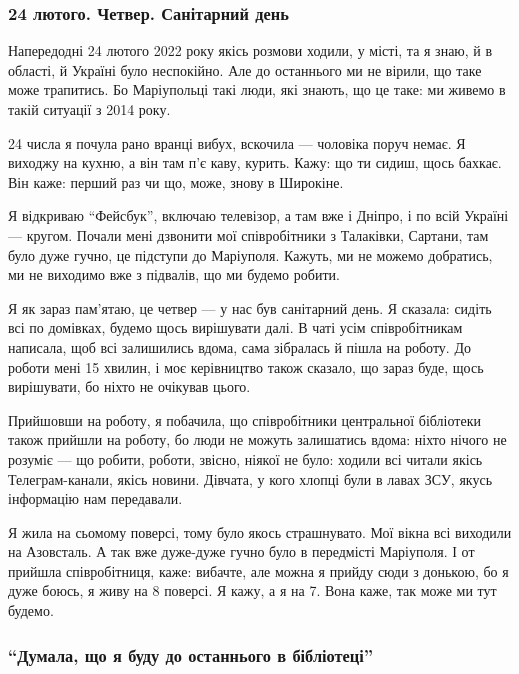 \subsubsection{24 лютого. Четвер. Санітарний день}

Напередодні 24 лютого 2022 року якісь розмови ходили, у місті, та я знаю, й в
області, й Україні було неспокійно. Але до останнього ми не вірили, що таке
може трапитись. Бо Маріупольці такі люди, які знають, що це таке: ми живемо в
такій ситуації з 2014 року.

24 числа я почула рано вранці вибух, вскочила — чоловіка поруч немає. Я виходжу
на кухню, а він там п'є каву, курить. Кажу: що ти сидиш, щось бахкає. Він каже:
перший раз чи що, може, знову в Широкіне.

Я відкриваю \enquote{Фейсбук}, включаю телевізор, а там вже і Дніпро, і по всій Україні
— кругом. Почали мені дзвонити мої співробітники з Талаківки, Сартани, там було
дуже гучно, це підступи до Маріуполя. Кажуть, ми не можемо добратись, ми не
виходимо вже з підвалів, що ми будемо робити.


Я як зараз пам'ятаю, це четвер — у нас був санітарний день. Я сказала: сидіть
всі по домівках, будемо щось вирішувати далі. В чаті усім співробітникам
написала, щоб всі залишились вдома, сама зібралась й пішла на роботу. До роботи
мені 15 хвилин, і моє керівництво також сказало, що зараз буде, щось
вирішувати, бо ніхто не очікував цього.

Прийшовши на роботу, я побачила, що співробітники центральної бібліотеки також
прийшли на роботу, бо люди не можуть залишатись вдома: ніхто нічого не розуміє
— що робити, роботи, звісно, ніякої не було: ходили всі читали якісь
Телеграм-канали, якісь новини. Дівчата, у кого хлопці були в лавах ЗСУ, якусь
інформацію нам передавали.

Я жила на сьомому поверсі, тому було якось страшнувато. Мої вікна всі виходили
на Азовсталь. А так вже дуже-дуже гучно було в передмісті Маріуполя. І от
прийшла співробітниця, каже: вибачте, але можна я прийду сюди з донькою, бо я
дуже боюсь, я живу на 8 поверсі. Я кажу, а я на 7. Вона каже, так може ми тут
будемо.


\subsubsection{\enquote{Думала, що я буду до останнього в бібліотеці}}

